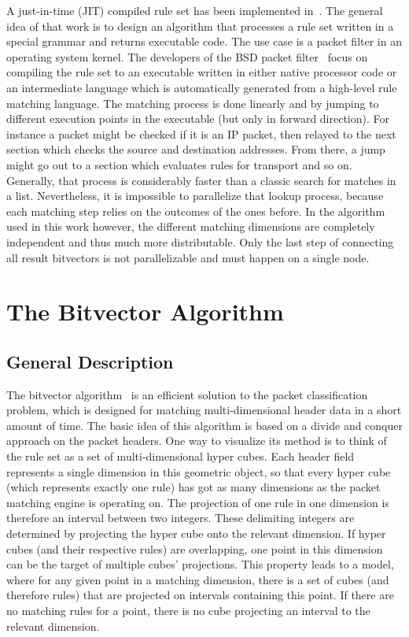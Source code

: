 \documentclass[a4paper,
		12pt,
		parskip=full,
		titlepage
		]{scrartcl}
\begin{document}
A just-in-time (JIT) compiled rule set has been implemented in~\cite{dpf}.
The general idea of that work is to design an algorithm that processes a rule set
written in a special grammar and returns executable code.
The use case is a packet filter in an operating system kernel.
The developers of the BSD packet filter~\cite{bpf, bpfplus} focus on compiling the rule set to an executable written in 
either native processor code or an intermediate language 
which is automatically generated from a high-level rule matching language.
The matching process is done linearly and by jumping to different execution points in the executable (but only in forward direction).
For instance a packet might be checked if it is an IP packet, then relayed 
to the next section which checks the source and destination addresses.
From there, a jump might go out to a section which evaluates rules for transport and so on.
Generally, that process is considerably faster than a classic search for matches in a list.
Nevertheless, it is impossible to parallelize that lookup process, because each matching step relies on the outcomes of the ones before.
In the algorithm used in this work however, the different matching dimensions are 
completely independent and thus much more distributable.
Only the last step of connecting all result bitvectors is not parallelizable and 
must happen on a single node.

\section{The Bitvector Algorithm}
\subsection{General Description}
\label{sec:bv-general}
The bitvector algorithm~\cite{bv} is an efficient solution to the packet 
classification problem, which is designed for matching multi-dimensional header data in a short amount of time.
The basic idea of this algorithm is based on a divide and conquer approach on the packet headers.
One way to visualize its method is to think of the rule set as a set of multi-dimensional hyper cubes.
Each header field represents a single dimension in this geometric object, so 
that every hyper cube (which represents exactly one rule) has got as many dimensions as the packet matching engine is operating on.
The projection of one rule in one dimension is therefore an interval between two integers.
These delimiting integers are determined by projecting the hyper cube onto the relevant dimension.
If hyper cubes (and their respective rules) are overlapping, one point in this dimension can be the target of multiple cubes' projections. 
This property leads to a model, where for any given point in a matching
dimension, there is a set of cubes (and therefore rules) that are projected on intervals containing this point.
If there are no matching rules for a point, there is no cube projecting an interval to the relevant dimension.
\end{document}
